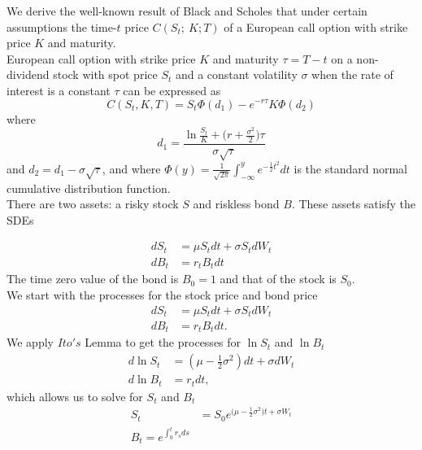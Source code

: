 \documentclass[a4 paper, 12pt]{report}
\theoremstyle{plain}
\begin{document}
We derive the well-known result of Black and Scholes that under certain assumptions the time-$t$ price $C(S_t;~K; T)$ of a European call option with strike price $K$ and maturity.\\
European call option with strike price $K$ and maturity $\tau = T-t$ on a non-dividend stock with spot price $S_t$ and a constant volatility $\sigma$ when the rate of interest is a constant $\tau$ can be expressed as
\begin{equation}\label{111}
C(S_t, K,T) = S_t\Phi(d_1) - e^{-r\tau}K\Phi(d_2)
\end{equation}
where
$$
d_1 = \frac{\ln\frac{S_t}{K}+\bigg(r+\frac{\sigma^2}{2}\bigg)\tau}{\sigma\sqrt{\tau}}
$$
and $d_2 = d_1-\sigma\sqrt{\tau}$, and where $\Phi(y) = \frac{1}{\sqrt{2\pi}}\int_{-\infty}^y e^{-\frac{1}{2}t^2}dt$ is the standard normal cumulative distribution function.\\ %
There are two assets: a risky  stock $S$ and riskless bond $B$. These assets satisfy the SDEs

\begin{equation}\label{22222222}
\begin{split}
dS_t& = \mu S_tdt+\sigma S_tdW_t\\
dB_t& = r_tB_tdt
\end{split}
\end{equation}
The time zero value of the bond is $B_0 = 1$ and that of the stock is $S_0$.\\
We start with the processes  for the stock price and bond price
\begin{align*}
dS_t& = \mu S_tdt+\sigma S_tdW_t\\
dB_t& = r_t B_tdt.
\end{align*} 
We apply $Ito's$ Lemma to get the processes for $\ln S_t$ and $\ln B_t$
\begin{align}
\label{3}
d\ln S_t& = (\mu - \frac{1}{2}\sigma^2)dt + \sigma dW_t\\
\label{4}
d\ln B_t& = r_tdt,
\end{align}
which allows us to solve for $S_t$ and $B_t$
\begin{align}
\label{5}
S_t& = S_0e^{\bigg(\mu - \frac{1}{2}\sigma^2\bigg)t+\sigma W_t}\\
\label{6}
B_t = e^{\int_0^t r_sds}
\end{align}
\end{document}
